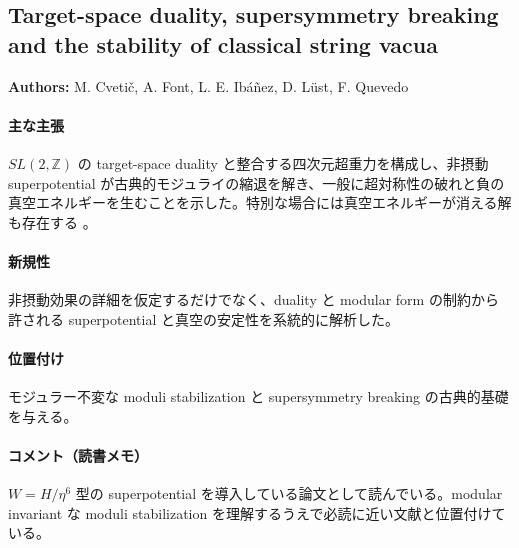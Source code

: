 \subsection{Target-space duality, supersymmetry breaking and the stability of classical string vacua}

\textbf{Authors:} M. Cveti\v{c}, A. Font, L. E. Ib\'{a}\~{n}ez, D. L\"{u}st, F. Quevedo

\paragraph{主な主張}
$SL(2,\mathbb{Z})$ の target-space duality と整合する四次元超重力を構成し、非摂動 superpotential が古典的モジュライの縮退を解き、一般に超対称性の破れと負の真空エネルギーを生むことを示した。特別な場合には真空エネルギーが消える解も存在する \cite{Cvetic:1991qm}。

\paragraph{新規性}
非摂動効果の詳細を仮定するだけでなく、duality と modular form の制約から許される superpotential と真空の安定性を系統的に解析した。

\paragraph{位置付け}
モジュラー不変な moduli stabilization と supersymmetry breaking の古典的基礎を与える。

\paragraph{コメント（読書メモ）}
$W=H/\eta^6$ 型の superpotential を導入している論文として読んでいる。modular invariant な moduli stabilization を理解するうえで必読に近い文献と位置付けている。
